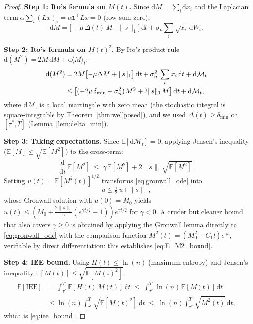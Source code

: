 \begin{proof}
\textbf{Step 1: Ito's formula on $M(t)$.}
Since $\mathrm{d}M = \sum_i \mathrm{d}x_i$ and the Laplacian term
$\alpha\sum_i(Lx)_i = \alpha\mathbf{1}^\top Lx = 0$ (row-sum zero),
\begin{equation}
  \mathrm{d}M = \bigl[-\mu\,\Delta(t)\,M + \|s\|_1\bigr]\,\mathrm{d}t
                + \sigma_n\sum_i \sqrt{x_i}\,\mathrm{d}W_i.
  \label{eq:dM}
\end{equation}

\textbf{Step 2: Ito's formula on $M(t)^2$.}
By Ito's product rule $\mathrm{d}(M^2)=2M\,\mathrm{d}M+\mathrm{d}\langle M\rangle_t$:
\begin{align}
  \mathrm{d}(M^2)
  &= 2M\bigl[-\mu\Delta M + \|s\|_1\bigr]\,\mathrm{d}t
   + \sigma_n^2\,\sum_i x_i\,\mathrm{d}t
   + \mathrm{d}\mathcal{M}_t \notag\\
  &\le \bigl[(-2\mu\,\delta_{\min} + \sigma_n^2)\,M^2
       + 2\|s\|_1\,M\bigr]\,\mathrm{d}t
   + \mathrm{d}\mathcal{M}_t,
  \label{eq:dM2}
\end{align}
where $\mathrm{d}\mathcal{M}_t$ is a local martingale with zero mean
(the stochastic integral is square-integrable by Theorem~\ref{thm:wellposed}),
and we used $\Delta(t)\ge\delta_{\min}$ on $[\tau^*,T]$ (Lemma~\ref{lem:delta_min}).

\textbf{Step 3: Taking expectations.}
Since $\mathbb{E}[\mathrm{d}\mathcal{M}_t]=0$, applying Jensen's inequality
($\mathbb{E}[M]\le\sqrt{\mathbb{E}[M^2]}$) to the cross-term:
\begin{equation}
  \frac{\mathrm{d}}{\mathrm{d}t}\,\mathbb{E}[M^2]
  \;\le\;
  \gamma\,\mathbb{E}[M^2] + 2\|s\|_1\sqrt{\mathbb{E}[M^2]}.
  \label{eq:gronwall_ode}
\end{equation}
Setting $u(t)=\mathbb{E}[M^2(t)]^{1/2}$ transforms \eqref{eq:gronwall_ode} into
\begin{equation}
  \dot{u} \le \tfrac{\gamma}{2}\,u + \|s\|_1,
\end{equation}
whose Gronwall solution with $u(0)=M_0$ yields
$u(t)\le (M_0+\frac{2\|s\|_1}{\gamma}(e^{\gamma t/2}-1))e^{\gamma t/2}$
for $\gamma<0$.
A cruder but cleaner bound that also covers $\gamma\ge 0$ is obtained by
applying the Gronwall lemma directly to \eqref{eq:gronwall_ode} with the
comparison function $\overline{M^2}(t)=(M_0^2+C_1 t)e^{\gamma t}$,
verifiable by direct differentiation: this establishes \eqref{eq:E_M2_bound}.

\textbf{Step 4: IEE bound.}
Using $H(t)\le\ln(n)$ (maximum entropy) and Jensen's inequality
$\mathbb{E}[M(t)]\le\sqrt{\mathbb{E}[M(t)^2]}$:
\begin{align*}
  \mathbb{E}[\mathrm{IEE}]
  &= \int_{\tau^*}^{T}\mathbb{E}[H(t)\,M(t)]\,\mathrm{d}t
  \;\le\; \int_{\tau^*}^{T}\ln(n)\,\mathbb{E}[M(t)]\,\mathrm{d}t\\
  &\le \ln(n)\int_{\tau^*}^{T}\sqrt{\mathbb{E}[M(t)^2]}\,\mathrm{d}t
  \;\le\; \ln(n)\int_{\tau^*}^{T}\sqrt{\overline{M^2}(t)}\,\mathrm{d}t,
\end{align*}
which is \eqref{eq:iee_bound}.


\end{proof}
